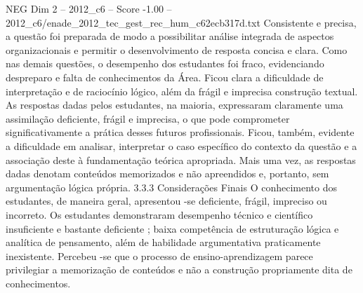 \begin{textsample}{NEG Dim 2 – 2012\_c6 – Score -1.00 – 2012\_c6/enade\_2012\_tec\_gest\_rec\_hum\_c62ecb317d.txt}
Consistente e precisa, a questão foi preparada de modo a possibilitar análise integrada de aspectos organizacionais e permitir o desenvolvimento de resposta concisa e clara.
Como nas demais questões, o desempenho dos estudantes foi fraco, evidenciando despreparo e falta de conhecimentos da Área.
Ficou clara a dificuldade de interpretação e de raciocínio lógico, além da frágil e imprecisa construção textual.
As respostas dadas pelos estudantes, na maioria, expressaram claramente uma assimilação deficiente, frágil e imprecisa, o que pode comprometer significativamente a prática desses futuros profissionais.
Ficou, também, evidente a dificuldade em analisar, interpretar o caso específico do contexto da questão e a associação deste à fundamentação teórica apropriada.
Mais uma vez, as respostas dadas denotam conteúdos memorizados e não apreendidos e, portanto, sem argumentação lógica própria. 3.3.3 Considerações Finais O conhecimento dos estudantes, de maneira geral, apresentou -se deficiente, frágil, impreciso ou incorreto.
Os estudantes demonstraram desempenho técnico e científico insuficiente e bastante deficiente ; baixa competência de estruturação lógica e analítica de pensamento, além de habilidade argumentativa praticamente inexistente.
Percebeu -se que o processo de ensino-aprendizagem parece privilegiar a memorização de conteúdos e não a construção propriamente dita de conhecimentos.

\end{textsample}
